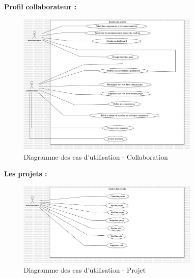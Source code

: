 \documentclass{article}
\begin{document}
                \textbf{Profil collaborateur :}
                \begin{figure}[h!]
                    \centering
                    \includegraphics[width=0.8\textwidth]{assets/diagrammes/jpg/Model5!UseCaseCollab_4.jpg}
                    \caption{Diagramme des cas d'utilisation - Collaboration}
                \end{figure}
                
                \FloatBarrier
                
                \textbf{Les projets :}
                \begin{figure}[h!]
                    \centering
                    \includegraphics[width=0.8\textwidth]{assets/diagrammes/jpg/Model6!UseCaseProject_5.jpg}
                    \caption{Diagramme des cas d'utilisation - Projet}
                \end{figure}
                \FloatBarrier
            
\end{document}
